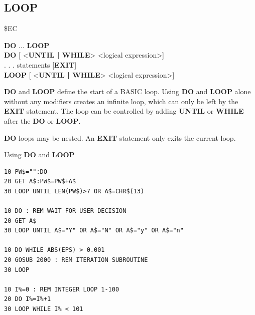 \subsection{LOOP}
\begin{description}[leftmargin=2cm,style=nextline]
\item [Token:] \$EC
\item [Format:] {\bf DO} ... {\bf LOOP} \\
                {\bf DO} [ <{\bf UNTIL | WHILE}> <logical expression>] \\
                . . . statements [{\bf EXIT}] \\
                {\bf LOOP} [ <{\bf UNTIL | WHILE}> <logical expression>]
\item [Usage:] {\bf DO} and {\bf LOOP} define
                the start of a BASIC loop.
                Using {\bf DO} and {\bf LOOP} alone without any
                modifiers creates an infinite loop, which can only be left
                by the {\bf EXIT} statement. The loop can be
                controlled by adding {\bf UNTIL} or {\bf WHILE}
                after the {\bf DO} or {\bf LOOP}.


\item [Remarks:] {\bf DO} loops may be nested. An {\bf EXIT} statement
only exits the current loop.
\item [Examples:] Using {\bf DO} and {\bf LOOP}
\begin{tcolorbox}[colback=black,coltext=white]
\verbatimfont{\codefont}
\begin{verbatim}
10 PW$="":DO
20 GET A$:PW$=PW$+A$
30 LOOP UNTIL LEN(PW$)>7 OR A$=CHR$(13)

10 DO : REM WAIT FOR USER DECISION
20 GET A$
30 LOOP UNTIL A$="Y" OR A$="N" OR A$="y" OR A$="n"

10 DO WHILE ABS(EPS) > 0.001
20 GOSUB 2000 : REM ITERATION SUBROUTINE
30 LOOP

10 I%=0 : REM INTEGER LOOP 1-100
20 DO I%=I%+1
30 LOOP WHILE I% < 101
\end{verbatim}
\end{tcolorbox}
\end{description}


\newpage
